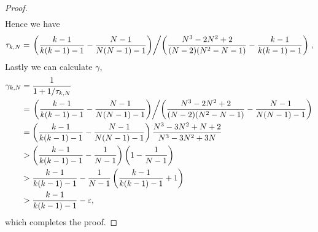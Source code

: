 \documentclass{ws-ijnt}
\begin{document}
\begin{proof}
\begin{align*}
		\end{align*}
		Hence we have
		\begin{align*}
			\tau_{k,N}
			=\left.\left(\frac{k-1}{k(k-1)-1}-\frac{N-1}{N(N-1)-1}\right)\middle/\left(\frac{N^3-2N^2+2}{(N-2)(N^2-N-1)}-\frac{k-1}{k(k-1)-1}\right)\right.
			,
		\end{align*}
		Lastly we can calculate $\gamma$,
		\begin{align*}
			\gamma_{k,N}
			&=\frac{1}{1+1/\tau_{k,N}} \\
			&=\left.\left(\frac{k-1}{k(k-1)-1}-\frac{N-1}{N(N-1)-1}\right)\middle/\left(\frac{N^3-2N^2+2}{(N-2)(N^2-N-1)}-\frac{N-1}{N(N-1)-1}\right)\right. \\
			&=\left(\frac{k-1}{k(k-1)-1}-\frac{N-1}{N(N-1)-1}\right)\frac{N^3-3N^2+N+2}{N^3-3N^2+3N} \\
			&>\left(\frac{k-1}{k(k-1)-1}-\frac{1}{N-1}\right)\left(1-\frac{1}{N-1}\right) \\
			&>\frac{k-1}{k(k-1)-1}-\frac{1}{N-1}\left(\frac{k-1}{k(k-1)-1}+1\right) \\
			&>\frac{k-1}{k(k-1)-1}-\varepsilon
			,
		\end{align*}
		which completes the proof.
	\end{proof}
	
\end{document}
